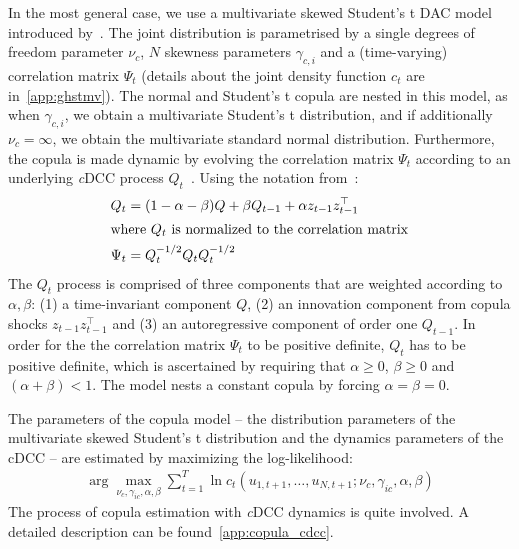 In the most general case, we use a multivariate skewed Student's t DAC model introduced by~\autocite{ChristoffersenErrunzaJacobLanglois2012}. The joint distribution is parametrised by a single degrees of freedom parameter $\nu_c$, $N$ skewness parameters $\gamma_{c,i}$ and a (time-varying) correlation matrix $\Psi_{t}$ (details about the joint density function $c_t$ are in~\autoref{app:ghstmv}). The normal and Student's t copula are nested in this model, as when $\gamma_{c,i}$, we obtain a multivariate Student's t distribution, and if additionally $\nu_c = \infty$, we obtain the multivariate standard normal distribution. Furthermore, the copula is made dynamic by evolving the correlation matrix $\Psi_t$ according to an underlying \emph{c}DCC process $Q_t$~\autocites[cf.]{Engle2002,Aielli2013}. Using the notation from~\autocite{ChristoffersenLanglois2013}:
\begin{align}
  Q_t &= (1 - \alpha - \beta) Q
    + \beta Q_{t - 1}
    + \alpha z_{t - 1} z_{t - 1}^\top \\
  \intertext{where $Q_t$ is normalized to the correlation matrix}
  \Psi_t &= Q_t^{-1/2} Q_t Q_t^{-1/2}
\end{align}
The $Q_t$ process is comprised of three components that are weighted according to $\alpha, \beta$: (1) a time-invariant component $Q$, (2) an innovation component from copula shocks $z_{t-1} z_{t-1}^\top$ and (3) an autoregressive component of order one $Q_{t-1}$. In order for the the correlation matrix $\Psi_t$ to be positive definite, $Q_t$ has to be positive definite, which is ascertained by requiring that $\alpha \geq 0$, $\beta \geq 0$ and $(\alpha + \beta) < 1$. The model nests a constant copula by forcing $\alpha = \beta = 0$.

The parameters of the copula model -- the distribution parameters of the multivariate skewed Student's t distribution and the dynamics parameters of the cDCC -- are estimated by maximizing the log-likelihood:
\begin{align}
  \arg\!\max_{\nu_c, \gamma_{ic}, \alpha, \beta} \sum_{t = 1}^T \ln c_t(u_{1, t+1}, \ldots, u_{N, t+1}; \nu_c, \gamma_{ic}, \alpha, \beta)
\end{align}
The process of copula estimation with \emph{c}DCC dynamics is quite involved. A detailed description can be found~\autoref{app:copula_cdcc}.

